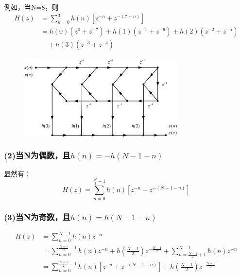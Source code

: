 \documentclass[notheorems,compress,mathserif,table]{beamer}
\newtheorem{example}{例题}
\begin{document}
\begin{frame}[shrink]\frametitle{}%
    例如，当N=8，则
\begin{equation*} \label{eq:1}
\begin{split}
H(z) &= \sum_{n=0}^{3}h(n)\left[ z^{-n}+z^{-(7-n)}\right] \\
     &= h(0)(z^0+z^{-7})+h(1)(z^{-1}+z^{-6})+h(2)(z^{-2}+z^{-5}) \\
     &\quad +h(3)(z^{-3}+z^{-4})
\end{split}
\end{equation*}

    \begin{figure}[h]
        \centering
        \includegraphics[width=0.75\textwidth]{osxxxw.jpg}
    \end{figure}
\end{frame}
\begin{frame}\frametitle{(2)当N为偶数，且$h(n)= -h(N-1-n)$}%
显然有：
    $$H(z) =\sum_{n=0}^{\frac{N}{2}-1}h(n)\left[ z^{-n}-z^{-(N-1-n)}\right]$$

\end{frame}
\begin{frame}\frametitle{(3)当N为奇数，且$h(n)= h(N-1-n)$}%
\begin{equation*} \label{eq:1}
\begin{split}
H(z) &= \sum_{n=0}^{N-1}h(n)z^{-n}\\
&= \sum_{n=0}^{\frac{N-1}{2}-1}h(n)z^{-n}+ h(\frac{N-1}{2})z^{-\frac{N-1}{2}}+
\sum_{n=\frac{N-1}{2}+1}^{N-1}h(n)z^{-n}\\
&= \sum_{n=0}^{\frac{N-1}{2}-1}h(n)\left[ z^{-n}+z^{-(N-1-n)}\right]+h(\frac{N-1}{2})z^{-\frac{N-1}{2}}
\end{split}
\end{equation*}
\end{frame}
\end{document}

